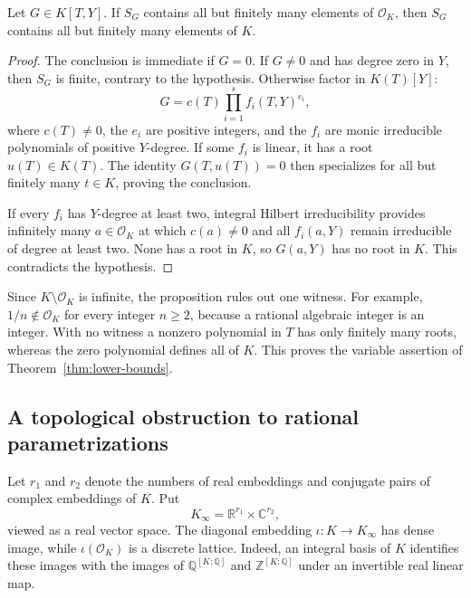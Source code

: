 \begin{proposition}\label{prop:one-witness}
Let $G\in K[T,Y]$.  If $S_G$ contains all but finitely many elements of
$\mathcal O_K$, then $S_G$ contains all but finitely many elements of $K$.
\end{proposition}
\begin{proof}
The conclusion is immediate if $G=0$.  If $G\neq0$ and has degree zero in
$Y$, then $S_G$ is finite, contrary to the hypothesis.  Otherwise factor in
$K(T)[Y]$:
\[
                G=c(T)\prod_{i=1}^{s}f_i(T,Y)^{e_i},
\]
where $c(T)\neq0$, the $e_i$ are positive integers, and the $f_i$ are monic
irreducible polynomials of positive $Y$-degree.
If some $f_i$ is linear, it has a root $u(T)\in K(T)$.  The identity
$G(T,u(T))=0$ then specializes for all but finitely many $t\in K$,
proving the conclusion.

If every $f_i$ has $Y$-degree at least two, integral Hilbert irreducibility
provides infinitely many $a\in\mathcal O_K$ at which $c(a)\neq0$ and all
$f_i(a,Y)$ remain irreducible of degree at least two.  None has a root in
$K$, so $G(a,Y)$ has no root in $K$.  This contradicts the hypothesis.
\end{proof}

Since $K\setminus\mathcal O_K$ is infinite, the proposition rules out one
witness.  For example, $1/n\notin\mathcal O_K$ for every integer $n\ge2$,
because a rational algebraic integer is an integer.  With no witness a
nonzero polynomial in $T$ has only finitely many roots, whereas the zero
polynomial defines all of $K$.  This proves the variable assertion of
Theorem~\ref{thm:lower-bounds}.

\subsection{A topological obstruction to rational parametrizations}

Let $r_1$ and $r_2$ denote the numbers of real embeddings and conjugate pairs
of complex embeddings of $K$.  Put
\[
 K_{\infty}=\mathbb R^{r_1}\times\mathbb C^{r_2},
\]
viewed as a real vector space.  The diagonal embedding
$\iota:K\longrightarrow K_{\infty}$ has dense image, while
$\iota(\mathcal O_K)$ is a discrete lattice.  Indeed, an integral basis of
$K$ identifies these images with the images of $\mathbb Q^{[K:\mathbb Q]}$
and $\mathbb Z^{[K:\mathbb Q]}$ under an invertible real linear map.

